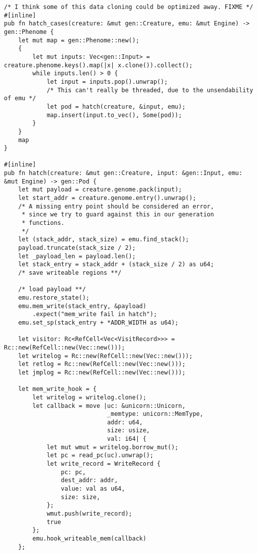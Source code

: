 \documentclass[11pt]{article}
\begin{document}
\lstset{language=rust,label=org413efbd,caption= ,captionpos=b,numbers=none}
\begin{lstlisting}
/* I think some of this data cloning could be optimized away. FIXME */
#[inline]
pub fn hatch_cases(creature: &mut gen::Creature, emu: &mut Engine) -> gen::Phenome {
    let mut map = gen::Phenome::new();
    {
        let mut inputs: Vec<gen::Input> = creature.phenome.keys().map(|x| x.clone()).collect();
        while inputs.len() > 0 {
            let input = inputs.pop().unwrap();
            /* This can't really be threaded, due to the unsendability of emu */
            let pod = hatch(creature, &input, emu);
            map.insert(input.to_vec(), Some(pod));
        }
    }
    map
}

#[inline]
pub fn hatch(creature: &mut gen::Creature, input: &gen::Input, emu: &mut Engine) -> gen::Pod {
    let mut payload = creature.genome.pack(input);
    let start_addr = creature.genome.entry().unwrap();
    /* A missing entry point should be considered an error,
     * since we try to guard against this in our generation
     * functions.
     */
    let (stack_addr, stack_size) = emu.find_stack();
    payload.truncate(stack_size / 2);
    let _payload_len = payload.len();
    let stack_entry = stack_addr + (stack_size / 2) as u64;
    /* save writeable regions **/

    /* load payload **/
    emu.restore_state();
    emu.mem_write(stack_entry, &payload)
        .expect("mem_write fail in hatch");
    emu.set_sp(stack_entry + *ADDR_WIDTH as u64);

    let visitor: Rc<RefCell<Vec<VisitRecord>>> = Rc::new(RefCell::new(Vec::new()));
    let writelog = Rc::new(RefCell::new(Vec::new()));
    let retlog = Rc::new(RefCell::new(Vec::new()));
    let jmplog = Rc::new(RefCell::new(Vec::new()));

    let mem_write_hook = {
        let writelog = writelog.clone();
        let callback = move |uc: &unicorn::Unicorn,
                             _memtype: unicorn::MemType,
                             addr: u64,
                             size: usize,
                             val: i64| {
            let mut wmut = writelog.borrow_mut();
            let pc = read_pc(uc).unwrap();
            let write_record = WriteRecord {
                pc: pc,
                dest_addr: addr,
                value: val as u64,
                size: size,
            };
            wmut.push(write_record);
            true
        };
        emu.hook_writeable_mem(callback)
    };


\end{lstlisting}
\end{document}
